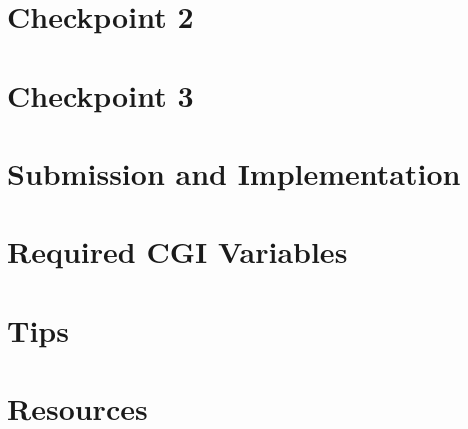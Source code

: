 \documentclass{article}
\begin{document}
\newpage
\section{Checkpoint 2}


\newpage
\section{Checkpoint 3}


\newpage
\section{Submission and Implementation}


\appendix

\newpage
\section{Required CGI Variables}


\newpage
\section{Tips}


\newpage
\section{Resources}


\newpage

\end{document}
